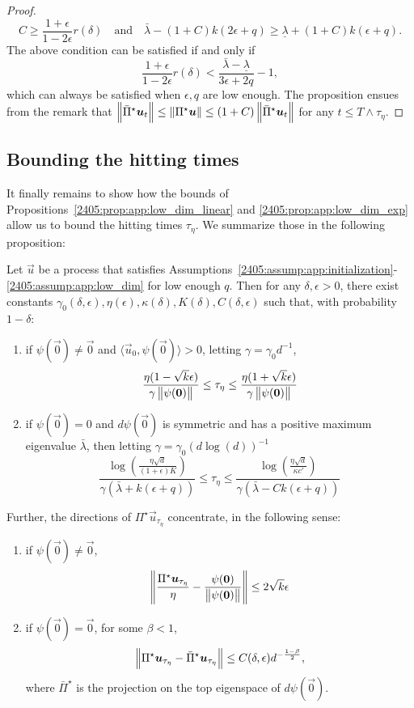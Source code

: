 \begin{proof}
     \[ C \geq \frac{1 + \epsilon}{1 - 2\epsilon}r(\delta) \quad \text{and} \quad \bar\lambda - (1+C)k(2\epsilon + q) \geq  \underline\lambda + (1+C)k(\epsilon + q).\]
     The above condition can be satisfied if and only if
     \[ \frac{1 + \epsilon}{1 - 2\epsilon}r(\delta) < \frac{\bar\lambda - \underline\lambda}{3\epsilon + 2q} - 1, \]
     which can always be satisfied when $\epsilon, q$ are low enough. The proposition ensues from the remark that $\left\lVert \bar\Pi^\star{\boldsymbol{u}}_t\right\rVert \leq \left\lVert \Pi^\star {\boldsymbol{u}}\right\rVert \leq (1+C)\left\lVert \bar\Pi^\star {\boldsymbol{u}}_t\right\rVert$ for any $t \leq T \wedge \tau_\eta$.
\end{proof}

\subsection{Bounding the hitting times}

It finally remains to show how the bounds of Propositions~\ref{2405:prop:app:low_dim_linear} and \ref{2405:prop:app:low_dim_exp} allow us to bound the hitting times $\tau_\eta$. We summarize those in the following proposition:
\begin{proposition}\label{2405:prop:app:hitting_times}
    Let $\vec{u}$ be a process that satisfies Assumptions~\ref{2405:assump:app:initialization}-\ref{2405:assump:app:low_dim} for low enough $q$. Then for any $\delta, \epsilon > 0$, there exist constants $\gamma_0(\delta, \epsilon), \eta(\epsilon), \kappa(\delta), K(\delta), C(\delta, \epsilon)$ such that, with probability $1 - \delta$:
    \begin{enumerate}
        \item if $\psi(\vec{0}) \neq \vec{0}$ and $\langle \vec{u}_0, \psi(\vec{0}) \rangle > 0$, letting $\gamma = \gamma_0 d^{-1}$,
        \[ \frac{\eta(1 - \sqrt{k}\epsilon)}{\gamma \left\lVert \psi({\boldsymbol{0}})\right\rVert} \leq \tau_\eta \leq \frac{\eta(1 + \sqrt{k}\epsilon)}{\gamma \left\lVert \psi({\boldsymbol{0}})\right\rVert} \]
        \item if $\psi(\vec{0}) = 0$ and $d\psi(\vec{0})$ is symmetric and has a positive maximum eigenvalue $\bar\lambda$, then letting $\gamma = \gamma_0 (d\log(d))^{-1}$
        \[ \frac{\log\left(\frac{\eta\sqrt{d}}{(1+\epsilon)K}\right)}{\gamma(\bar\lambda + k(\epsilon + q))} \leq \tau_\eta \leq \frac{\log\left(\frac{\eta\sqrt{d}}{\kappa c'}\right)}{\gamma(\bar\lambda - Ck(\epsilon + q))}\]
    \end{enumerate}
    Further, the directions of $\Pi^\star \vec{u}_{\tau_\eta}$ concentrate, in the following sense:
    \begin{enumerate}
        \item if $\psi(\vec{0}) \neq \vec{0}$,
        \[ \left\lVert \frac{\Pi^\star {\boldsymbol{u}}_{\tau_\eta}}{\eta} -  \frac{\psi({\boldsymbol{0}})}{\left\lVert \psi({\boldsymbol{0}})\right\rVert}\right\rVert \leq 2\sqrt{k}\epsilon \]
        \item if $\psi(\vec{0}) = \vec{0}$, for some $\beta < 1$,
        \[ \left\lVert \Pi^\star {\boldsymbol{u}}_{\tau_\eta} - \bar \Pi^\star {\boldsymbol{u}}_{\tau_\eta}\right\rVert \leq C(\delta, \epsilon) d^{-\frac{1 - \beta}{2}},\]
        where $\bar\Pi^\star$ is the projection on the top eigenspace of $d\psi(\vec{0})$.
    \end{enumerate}
\end{proposition}

